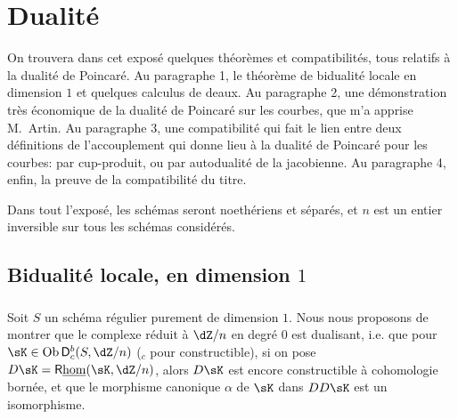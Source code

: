
\chapter{Dualité}\label{V}




















On trouvera dans cet expos\'e quelques th\'eor\`emes et compatibilit\'es, tous 
relatifs \`a la dualit\'e de Poincar\'e. Au paragraphe 1, le th\'eor\`eme de 
bidualit\'e locale en dimension $1$ \cite[I.5.1]{sga5} et quelques calculus de 
deaux. Au paragraphe 2, une d\'emonstration tr\`es \'economique de la dualit\'e 
de Poincar\'e sur les courbes, que m'a apprise M.\ Artin. Au paragraphe 3, une 
compatibilit\'e qui fait le lien entre deux d\'efinitions de l'accouplement qui 
donne lieu \`a la dualit\'e de Poincar\'e pour les courbes: par cup-produit, ou 
par autodualit\'e de la jacobienne. Au paragraphe 4, enfin, la preuve de la 
compatibilit\'e du titre. 

Dans tout l'expos\'e, les sch\'emas seront noeth\'eriens et s\'epar\'es, et $n$ 
est un entier inversible sur tous les sch\'emas consid\'er\'es. 










\section{Bidualit\'e locale, en dimension \texorpdfstring{$1$}{1}}\label{V:1}





\subsection{}\label{V:1-1}

Soit $S$ un sch\'ema r\'egulier purement de dimension $1$. Nous nous proposons 
de montrer que le complexe r\'eduit \`a $\dZ/n$ en degr\'e $0$ est 
dualisant, i.e. que pour $\sK\in \ob\D_c^b(S,\dZ/n)$ ($_c$ pour constructible), 
si on pose $D\sK=\R\underline\hom(\sK,\dZ/n)$, alors $D\sK$ est encore 
constructible \`a cohomologie born\'ee, et que le morphisme canonique $\alpha$ 
de $\sK$ dans $D D\sK$ est un isomorphisme. 

